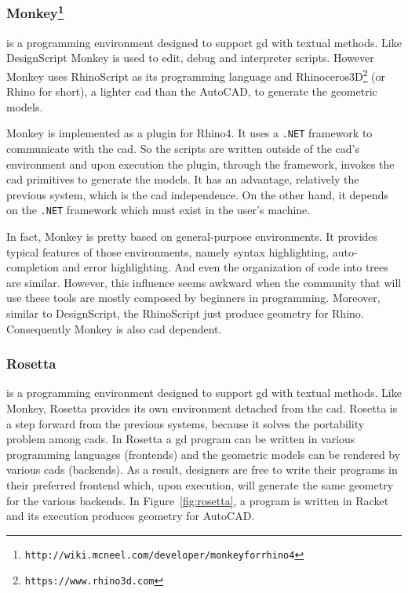\subsubsection{Monkey\protect\footnote{\texttt{http://wiki.mcneel.com/developer/monkeyforrhino4}}} is a programming environment designed to support \ac{gd} with textual methods. Like DesignScript Monkey is used to edit, debug and interpreter scripts. However Monkey uses RhinoScript as its programming language and Rhinoceros3D\footnote{\label{rhin}\texttt{https://www.rhino3d.com}} (or Rhino for short), a lighter \ac{cad} than the AutoCAD, to generate the geometric models.

Monkey is implemented as a plugin for Rhino4. It uses a \texttt{.NET} framework to communicate with the \ac{cad}. So the scripts are written outside of the \ac{cad}'s environment and upon execution the plugin, through the framework, invokes the \ac{cad} primitives to generate the models. It has an advantage, relatively the previous system, which is the \ac{cad} independence. On the other hand, it depends on the \texttt{.NET} framework which must exist in the user's machine.

In fact, Monkey is pretty based on general-purpose environments. It provides typical features of those environments, namely syntax highlighting, auto-completion and error highlighting. And even the organization of code into trees are similar. However, this influence seems awkward when the community that will use these tools are mostly composed by beginners in programming. Moreover, similar to DesignScript, the RhinoScript just produce geometry for Rhino. Consequently Monkey is also \ac{cad} dependent. 
\subsubsection{Rosetta~\cite{lopes2011portable}} is a programming environment designed to support \ac{gd} with textual methods. Like Monkey, Rosetta provides its own environment detached from the \ac{cad}. Rosetta is a step forward from the previous systems, because it solves the portability problem among \ac{cad}s. In Rosetta a \ac{gd} program can be written in various programming languages (frontends) and the geometric models can be rendered by various \ac{cad}s (backends). As a result, designers are free to write their programs in their preferred frontend which, upon execution, will generate the same geometry for the various backends. In Figure~\ref{fig:rosetta}, a program is written in Racket and its execution produces geometry for AutoCAD.


